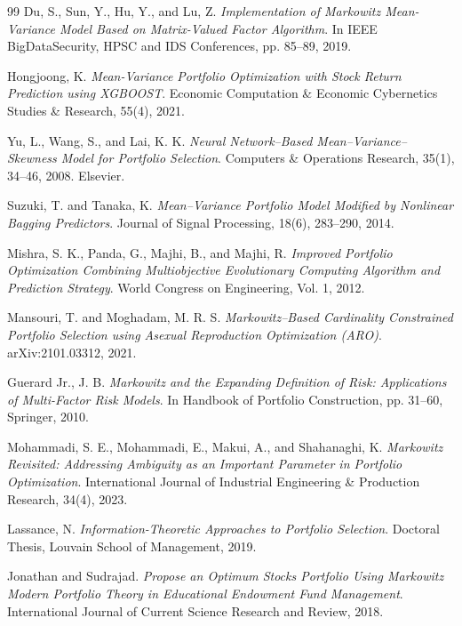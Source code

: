 \documentclass[preprint,12pt]{elsarticle}
\theoremstyle{plain}
\theoremstyle{definition}
\begin{document}
\begin{thebibliography}{99}
Du, S., Sun, Y., Hu, Y., and Lu, Z.  
\textit{Implementation of Markowitz Mean-Variance Model Based on Matrix-Valued Factor Algorithm}.  
In IEEE BigDataSecurity, HPSC and IDS Conferences, pp. 85--89, 2019.

Hongjoong, K.  
\textit{Mean-Variance Portfolio Optimization with Stock Return Prediction using XGBOOST}.  
Economic Computation \& Economic Cybernetics Studies \& Research, 55(4), 2021.

Yu, L., Wang, S., and Lai, K. K.  
\textit{Neural Network--Based Mean--Variance--Skewness Model for Portfolio Selection}.  
Computers \& Operations Research, 35(1), 34--46, 2008. Elsevier.

Suzuki, T. and Tanaka, K.  
\textit{Mean--Variance Portfolio Model Modified by Nonlinear Bagging Predictors}.  
Journal of Signal Processing, 18(6), 283--290, 2014.

Mishra, S. K., Panda, G., Majhi, B., and Majhi, R.  
\textit{Improved Portfolio Optimization Combining Multiobjective Evolutionary Computing Algorithm and Prediction Strategy}.  
World Congress on Engineering, Vol. 1, 2012.

Mansouri, T. and Moghadam, M. R. S.  
\textit{Markowitz--Based Cardinality Constrained Portfolio Selection using Asexual Reproduction Optimization (ARO)}.  
arXiv:2101.03312, 2021.

Guerard Jr., J. B.  
\textit{Markowitz and the Expanding Definition of Risk: Applications of Multi-Factor Risk Models}.  
In Handbook of Portfolio Construction, pp. 31--60, Springer, 2010.

Mohammadi, S. E., Mohammadi, E., Makui, A., and Shahanaghi, K.  
\textit{Markowitz Revisited: Addressing Ambiguity as an Important Parameter in Portfolio Optimization}.  
International Journal of Industrial Engineering \& Production Research, 34(4), 2023.

Lassance, N.  
\textit{Information-Theoretic Approaches to Portfolio Selection}.  
Doctoral Thesis, Louvain School of Management, 2019.

Jonathan and Sudrajad.  
\textit{Propose an Optimum Stocks Portfolio Using Markowitz Modern Portfolio Theory in Educational Endowment Fund Management}.  
International Journal of Current Science Research and Review, 2018.


\end{thebibliography}
\end{document}
